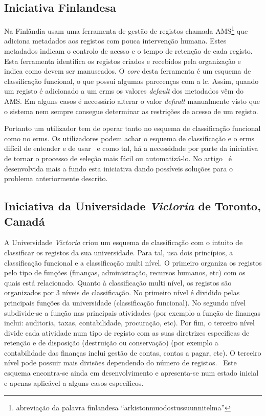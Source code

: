 \subsection{Iniciativa Finlandesa}
Na Finlândia usam uma ferramenta de gestão de registos chamada AMS\footnote{abreviação da palavra finlandesa ``arkistonmuodostussuunnitelma''} que adiciona metadados aos registos com pouca intervenção humana. Estes metadados indicam o controlo de acesso e o tempo de retenção de cada registo. Esta ferramenta identifica os registos criados e recebidos pela organização e indica como devem ser manuseados. O \textit{core} desta ferramenta é um esquema de classificação funcional, o que possui algumas parecenças com a \acrshort{lc}. Assim, quando um registo é adicionado a um \acrfull{erms} os valores \textit{default} dos metadados vêm do AMS. Em alguns casos é necessário alterar o valor \textit{default} manualmente visto que o sistema nem sempre consegue determinar as restrições de acesso de um registo.

Portanto um utilizador tem de operar tanto no esquema de classificação funcional como no \acrshort{erms}. Os utilizadores podem achar o esquema de classificação e o \acrshort{erms} difícil de entender e de usar~\cite{finInit} e como tal, há a necessidade por parte da iniciativa de tornar o processo de seleção mais fácil ou automatizá-lo. No artigo~\cite{finInit} é desenvolvida mais a fundo esta iniciativa dando possíveis soluções para o problema anteriormente descrito.

\subsection{Iniciativa da Universidade \textit{Victoria} de Toronto, Canadá}

A Universidade \textit{Victoria} criou um esquema de classificação com o intuito de classificar os registos da sua universidade. Para tal, usa dois princípios, a classificação funcional e a classificação multi nível. O primeiro organiza os registos pelo tipo de funções (finanças, administração, recursos humanos, etc) com os quais está relacionado. Quanto à classificação multi nível, os registos são organizados por 3 níveis de classificação. No primeiro nível é dividido pelas principais funções da universidade (classificação funcional). No segundo nível subdivide-se a função nas principais atividades (por exemplo a função de finanças inclui: auditoria, taxas, contabilidade, procuração, etc). Por fim, o terceiro nível divide cada atividade num tipo de registo com as suas diretrizes especificas de retenção e de disposição (destruição ou conservação) (por exemplo a contabilidade das finanças inclui gestão de contas, contas a pagar, etc). O terceiro nível pode possuir mais divisões dependendo do número de registos.~\cite{uniInit} Este esquema encontra-se ainda em desenvolvimento e apresenta-se num estado inicial e apenas aplicável a alguns casos específicos.

